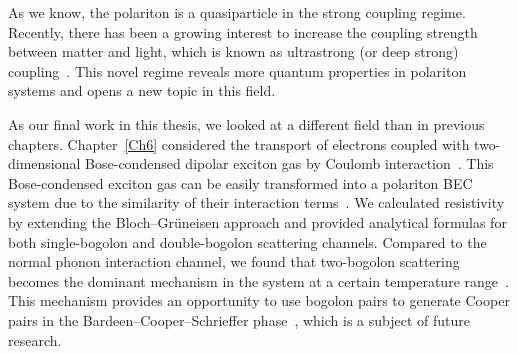 As we know, the polariton is a quasiparticle in the strong coupling regime.
Recently, there has been a growing interest to increase the coupling strength between matter and light, which is known as ultrastrong (or deep strong) coupling~\cite{Anappara:2009aa,Gunter:2009aa,Frisk-Kockum:2019aa,Forn-Diaz:2019aa}.
This novel regime reveals more quantum properties in polariton systems and opens a new topic in this field.

As our final work in this thesis, we looked at a different field than in previous chapters. Chapter~\ref{Ch6}  considered the transport of electrons coupled with two-dimensional Bose-condensed dipolar exciton gas by Coulomb interaction~\cite{Kovalev:2013aa,Batyev:2014aa,Boev:2018ab,Sun:2019aa,Villegas:2019aa}.
This Bose-condensed exciton gas can be easily transformed into a polariton BEC system due to the similarity of their interaction terms~\cite{Deng:2010aa,Kavokin:2007aa}.
We calculated resistivity by extending the Bloch--Gr\"{u}neisen approach and provided analytical formulas for both single-bogolon and double-bogolon scattering channels.
Compared to the normal phonon interaction channel, we found that two-bogolon scattering becomes the dominant mechanism in the system at a certain temperature range~\cite{Hwang:2008aa}.
This mechanism provides an opportunity to use bogolon pairs to generate Cooper pairs in the Bardeen--Cooper--Schrieffer phase~\cite{Laussy:2010aa}, which is a subject of future research.
